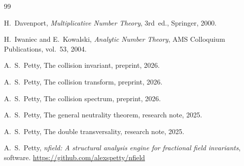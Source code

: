 \documentclass[12pt]{amsart}
\theoremstyle{definition}
\theoremstyle{remark}
\begin{document}
\begin{thebibliography}{99}

H.~Davenport,
\emph{Multiplicative Number Theory},
3rd~ed., Springer, 2000.

H.~Iwaniec and E.~Kowalski,
\emph{Analytic Number Theory},
AMS Colloquium Publications, vol.~53, 2004.

A.~S.~Petty,
The collision invariant,
preprint, 2026.

A.~S.~Petty,
The collision transform,
preprint, 2026.

A.~S.~Petty,
The collision spectrum,
preprint, 2026.

A.~S.~Petty,
The general neutrality theorem,
research note, 2025.

A.~S.~Petty,
The double transversality,
research note, 2025.

A.~S.~Petty,
\emph{nfield: A structural analysis engine for fractional
field invariants},
software.
\url{https://github.com/alexspetty/nfield}

\end{thebibliography}
\end{document}
